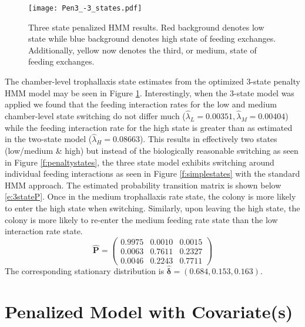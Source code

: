 \documentclass[smallextended]{svjour3}       %
\begin{document}
% 
\begin{figure}
 \centerline{\texttt{[image: Pen3\_-3\_states.pdf]}}
\caption{Three state penalized HMM results. Red background denotes low state while blue background denotes high state of feeding exchanges. Additionally, yellow now denotes the third, or medium, state of feeding exchanges.}
\label{f:pen3states}
\end{figure}
The chamber-level trophallaxis state estimates from the optimized 3-state penalty HMM model may be seen in Figure \ref{f:pen3states}. Interestingly, when the 3-state model was applied we found that the feeding interaction rates for the low and medium chamber-level state switching do not differ much ($\hat{\lambda}_L = 0.00351, \hat{\lambda}_M = 0.00404$)  while the feeding interaction rate for the high state is greater than as estimated in the two-state model ($\hat{\lambda}_H = 0.08663$). This results in effectively two states (low/medium \& high) but instead of the biologically reasonable switching as seen in Figure \ref{f:penaltystates}, the three state model exhibits switching around individual feeding interactions as seen in Figure \ref{f:simplestates} with the standard HMM approach. 
The estimated probability transition matrix is shown below \eqref{e:3stateP}. Once in the medium trophallaxis rate state, the colony is more likely to enter the high state when switching. Similarly, upon leaving the high state, the colony is more likely to re-enter the medium feeding rate state than the low interaction rate state.
\begin{equation}
\hat{\mathbf{P}} = \begin{pmatrix}
 0.9975 & 0.0010 & 0.0015 \\
 0.0063 & 0.7611 & 0.2327 \\
 0.0046 & 0.2243 & 0.7711
\end{pmatrix}
\label{e:3stateP}
\end{equation}
The corresponding stationary distribution is $\bm{\hat{\delta}} = (0.684, 0.153, 0.163)$.
% 
\section{Penalized Model with Covariate(s)}
\label{s:covariate}
\end{document}
